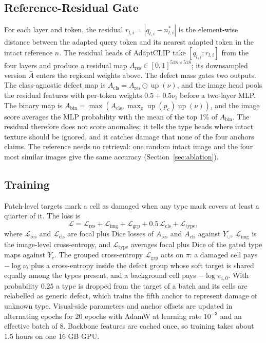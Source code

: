 \documentclass[conference]{IEEEtran}
\begin{document}
\subsection{Reference-Residual Gate}
\label{sec:rrg}
For each layer and token, the residual $r_{l,i}=|q_{l,i}-n^*_{l,i}|$ is the element-wise distance between the adapted query token and its nearest adapted token in the intact reference $n$. The residual heads of AdaptCLIP take $[q_{l,i};r_{l,i}]$ from the four layers and produce a residual map $A_{\mathrm{res}}\in[0,1]^{518\times518}$; its downsampled version $\bar A$ enters the regional weights above. The defect mass gates two outputs. The class-agnostic defect map is $A_{\mathrm{cls}}=A_{\mathrm{res}}\odot\operatorname{up}(\nu)$, and the image head pools the residual features with per-token weights $0.5+0.5\nu_i$ before a two-layer MLP. The binary map is $A_{\mathrm{bin}}=\max\!\left(A_{\mathrm{cls}},\max_c \operatorname{up}(p_c)\operatorname{up}(\nu)\right)$, and the image score averages the MLP probability with the mean of the top 1\% of $A_{\mathrm{bin}}$. The residual therefore does not score anomalies; it tells the type heads where intact texture should be ignored, and it catches damage that none of the four anchors claims. The reference needs no retrieval: one random intact image and the four most similar images give the same accuracy (Section~\ref{sec:ablation}).

\subsection{Training}
Patch-level targets mark a cell as damaged when any type mask covers at least a quarter of it. The loss is
\begin{equation}
\mathcal{L}=\mathcal{L}_{\mathrm{res}}+\mathcal{L}_{\mathrm{img}}+\mathcal{L}_{\mathrm{grp}}+0.5\,\mathcal{L}_{\mathrm{cls}}+\mathcal{L}_{\mathrm{type}},
\end{equation}
where $\mathcal{L}_{\mathrm{res}}$ and $\mathcal{L}_{\mathrm{cls}}$ are focal plus Dice losses of $A_{\mathrm{res}}$ and $A_{\mathrm{cls}}$ against $Y_\cup$, $\mathcal{L}_{\mathrm{img}}$ is the image-level cross-entropy, and $\mathcal{L}_{\mathrm{type}}$ averages focal plus Dice of the gated type maps against $Y_c$. The grouped cross-entropy $\mathcal{L}_{\mathrm{grp}}$ acts on $\pi$: a damaged cell pays $-\log\nu_i$ plus a cross-entropy inside the defect group whose soft target is shared equally among the types present, and a background cell pays $-\log\pi_{i,0}$. With probability $0.25$ a type is dropped from the target of a batch and its cells are relabelled as generic defect, which trains the fifth anchor to represent damage of unknown type. Visual-side parameters and anchor offsets are updated in alternating epochs for 20 epochs with AdamW at learning rate $10^{-3}$ and an effective batch of 8. Backbone features are cached once, so training takes about 1.5 hours on one 16 GB GPU.
\end{document}
